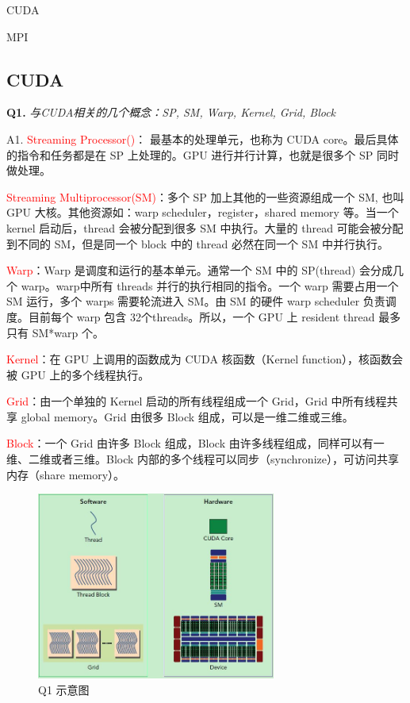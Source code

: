 \documentclass[cn,10pt,math=newtx,citestyle=gb7714-2015,bibstyle=gb7714-2015]{elegantbook}
\begin{document}
\begin{introduction}
\item CUDA
\item MPI
\end{introduction}

\subsection{CUDA}

\textbf{Q1.} \textit{与CUDA相关的几个概念：SP, SM, Warp, Kernel, Grid, Block}

A1. \textcolor{red}{Streaming Processor()}： 最基本的处理单元，也称为 CUDA core。最后具体的指令和任务都是在 SP 上处理的。GPU 进行并行计算，也就是很多个 SP 同时做处理。

\textcolor{red}{Streaming Multiprocessor(SM)}：多个 SP 加上其他的一些资源组成一个 SM, 也叫 GPU 大核。其他资源如：warp scheduler，register，shared memory 等。当一个 kernel 启动后，thread 会被分配到很多 SM 中执行。大量的 thread 可能会被分配到不同的 SM，但是同一个 block 中的 thread 必然在同一个 SM 中并行执行。

\textcolor{red}{Warp}：Warp 是调度和运行的基本单元。通常一个 SM 中的 SP(thread) 会分成几个 warp。warp中所有 threads 并行的执行相同的指令。一个 warp 需要占用一个 SM 运行，多个 warps 需要轮流进入 SM。由 SM 的硬件 warp scheduler 负责调度。目前每个 warp 包含 32个threads。所以，一个 GPU 上 resident thread 最多只有 SM*warp 个。

\textcolor{red}{Kernel}：在 GPU 上调用的函数成为 CUDA 核函数（Kernel function），核函数会被 GPU 上的多个线程执行。

\textcolor{red}{Grid}：由一个单独的 Kernel 启动的所有线程组成一个 Grid，Grid 中所有线程共享 global memory。Grid 由很多 Block 组成，可以是一维二维或三维。

\textcolor{red}{Block}：一个 Grid 由许多 Block 组成，Block 由许多线程组成，同样可以有一维、二维或者三维。Block 内部的多个线程可以同步（synchronize），可访问共享内存（share memory）。

\begin{figure}[ht]
  \centering
  \includegraphics[width=0.7\textwidth]{image/1.3.1.q1.jpeg}
  \caption{Q1 示意图}
\end{figure}
\end{document}
